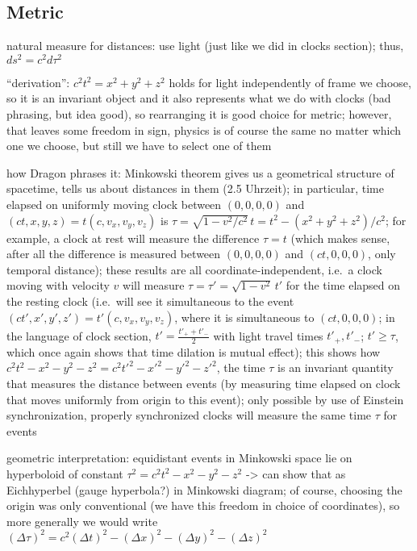 		\subsection{Metric}
natural measure for distances: use light (just like we did in clocks section); thus, $ds^2 = c^2 d\tau^2$

\enquote{derivation}: $c^2 t^2 = x^2 + y^2 + z^2$ holds for light independently of frame we choose, so it is an invariant object and it also represents what we do with clocks (bad phrasing, but idea good), so rearranging it is good choice for metric; however, that leaves some freedom in sign, physics is of course the same no matter which one we choose, but still we have to select one of them


how Dragon phrases it: Minkowski theorem gives us a geometrical structure of spacetime, tells us about distances in them (2.5 Uhrzeit); in particular, time elapsed on uniformly moving clock between $(0, 0, 0, 0)$ and $(ct, x, y, z) = t (c, v_x, v_y, v_z)$ is $\tau = \sqrt{1 - v^2 / c^2} \, t = t^2 - (x^2 + y^2 + z^2) / c^2$; for example, a clock at rest will measure the difference $\tau = t$ (which makes sense, after all the difference is measured between $(0, 0, 0, 0)$ and $(ct, 0, 0, 0)$, only temporal distance); these results are all coordinate-independent, i.e.~a clock moving with velocity $v$ will measure $\tau = \tau' = \sqrt{1 - v^2} \, t'$ for the time elapsed on the resting clock (i.e.~will see it simultaneous to the event $(ct', x', y', z') = t' (c, v_x, v_y, v_z)$, where it is simultaneous to $(ct, 0, 0, 0)$; in the language of clock section, $t' = \frac{t'_+ + t'_-}{2}$ with light travel times $t'_+, t'_-$; $t' \geq \tau$, which once again shows that time dilation is mutual effect); this shows how $c^2 t^2 - x^2 - y^2 - z^2 = c^2 t'^2 - x'^2 - y'^2 - z'^2$, the time $\tau$ is an invariant quantity that measures the distance between events (by measuring time elapsed on clock that moves uniformly from origin to this event); only possible by use of Einstein synchronization, properly synchronized clocks will measure the same time $\tau$ for events

geometric interpretation: equidistant events in Minkowski space lie on hyperboloid of constant $\tau^2 = c^2 t^2 - x^2 - y^2 - z^2$ -> can show that as Eichhyperbel (gauge hyperbola?) in Minkowski diagram; of course, choosing the origin was only conventional (we have this freedom in choice of coordinates), so more generally we would write $(\Delta \tau)^2 = c^2 (\Delta t)^2 - (\Delta x)^2 - (\Delta y)^2 - (\Delta z)^2$

